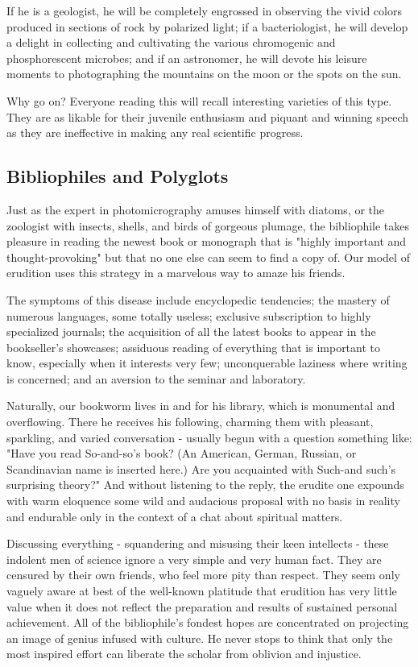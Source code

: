 \documentclass{article}
\begin{document}
If he is a geologist, he will be completely engrossed in observing the vivid colors produced in sections of rock by polarized light; if a bacteriologist, he will develop a delight in collecting and cultivating the various chromogenic and phosphorescent microbes; and if an astronomer, he will devote his leisure moments to photographing the mountains on the moon or the spots on the sun.

Why go on? Everyone reading this will recall interesting varieties of this type. They are as likable for their juvenile enthusiasm and piquant and winning speech as they are ineffective in making any real scientific progress.

\subsection*{Bibliophiles and Polyglots}

Just as the expert in photomicrography amuses himself with diatoms, or the zoologist with insects, shells, and birds of gorgeous plumage, the bibliophile takes pleasure in reading the newest book or monograph that is "highly important and thought-provoking" but that no one else can seem to find a copy of. Our model of erudition uses this strategy in a marvelous way to amaze his friends.

The symptoms of this disease include encyclopedic tendencies; the mastery of numerous languages, some totally useless; exclusive subscription to highly specialized journals; the acquisition of all the latest books to appear in the bookseller’s showcases; assiduous reading of everything that is important to know, especially when it interests very few; unconquerable laziness where writing is concerned; and an aversion to the seminar and laboratory.

Naturally, our bookworm lives in and for his library, which is monumental and overflowing. There he receives his following, charming them with pleasant, sparkling, and varied conversation - usually begun with a question something like: "Have you read So-and-so’s book? (An American, German, Russian, or Scandinavian name is inserted here.) Are you acquainted with Such-and such’s surprising theory?" And without listening to the reply, the erudite one expounds with warm eloquence some wild and audacious proposal with no basis in reality and endurable only in the context of a chat about spiritual matters.

Discussing everything - squandering and misusing their keen intellects - these indolent men of science ignore a very simple and very human fact. They are censured by their own friends, who feel more pity than respect. They seem only vaguely aware at best of the well-known platitude that erudition has very little value when it does not reflect the preparation and results of sustained personal achievement. All of the bibliophile’s fondest hopes are concentrated on projecting an image of genius infused with culture. He never stops to think that only the most inspired effort can liberate the scholar from oblivion and injustice.
\end{document}
